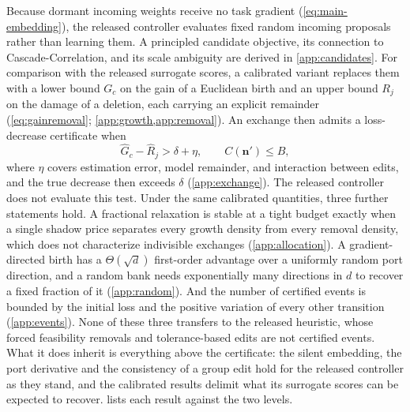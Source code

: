 \documentclass[10pt]{article}
\theoremstyle{paper}
\begin{document}
Because dormant incoming weights receive no task gradient (\cref{eq:main-embedding}), the released controller evaluates fixed random incoming proposals rather than learning them. A principled candidate objective, its connection to Cascade-Correlation, and its scale ambiguity are derived in \cref{app:candidates}. For comparison with the released surrogate scores, a calibrated variant replaces them with a lower bound $G_c$ on the gain of a Euclidean birth and an upper bound $R_j$ on the damage of a deletion, each carrying an explicit remainder (\cref{eq:gainremoval}; \cref{app:growth,app:removal}). An exchange then admits a loss-decrease certificate when
\begin{equation}
\widehat G_c-\widehat R_j>\delta+\eta,
\qquad C(\bm n')\le B,
\label{eq:exchange}
\end{equation}
where $\eta$ covers estimation error, model remainder, and interaction between edits, and the true decrease then exceeds $\delta$ (\cref{app:exchange}). The released controller does not evaluate this test. Under the same calibrated quantities, three further statements hold. A fractional relaxation is stable at a tight budget exactly when a single shadow price separates every growth density from every removal density, which does not characterize indivisible exchanges (\cref{app:allocation}). A gradient-directed birth has a $\Theta(\sqrt d)$ first-order advantage over a uniformly random port direction, and a random bank needs exponentially many directions in $d$ to recover a fixed fraction of it (\cref{app:random}). And the number of certified events is bounded by the initial loss and the positive variation of every other transition (\cref{app:events}). None of these three transfers to the released heuristic, whose forced feasibility removals and tolerance-based edits are not certified events. What it does inherit is everything above the certificate: the silent embedding, the port derivative and the consistency of a group edit hold for the released controller as they stand, and the calibrated results delimit what its surrogate scores can be expected to recover.  lists each result against the two levels.
\end{document}
